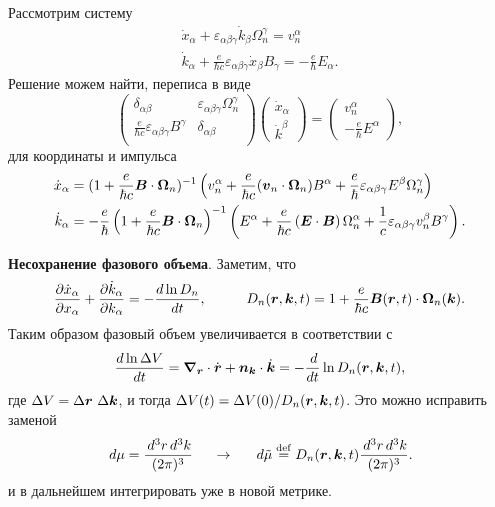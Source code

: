 Рассмотрим систему
\begin{align*}
	\dot{x}_\alpha + \varepsilon_{\alpha \beta \gamma} \dot{k}_\beta \Omega_n^\gamma = v_n^\alpha \\ 
	\dot{k}_\alpha + \frac{e}{\hbar c} \varepsilon_{\alpha \beta \gamma} \dot{x}_\beta B_\gamma = - \frac{e}{\hbar} E_\alpha.
\end{align*}
Решение можем найти, переписа в виде
\begin{equation*}
	\begin{pmatrix}
	    \delta_{\alpha \beta} & \varepsilon_{\alpha \beta \gamma} \Omega^\gamma_n  \\
	    \frac{e}{\hbar c}\varepsilon_{\alpha \beta \gamma} B^\gamma & \delta_{\alpha \beta}  \\
	\end{pmatrix} \begin{pmatrix}
		\dot{x}_\alpha \\ \dot{k}^\beta
	\end{pmatrix} = \begin{pmatrix}
		v_n^{\alpha} \\  -\frac{e}{\hbar} E^{\alpha}
	\end{pmatrix},
\end{equation*}
для координаты и импульса
\begin{align*}
	\dot{x}_\alpha &= (1 + \frac{e}{\hbar c} \boldsymbol{B} \cdot \boldsymbol{\Omega}_n)^{-1}\left(
		v_n^\alpha + \frac{e}{\hbar c} (\boldsymbol{v}_n \cdot \boldsymbol{\Omega}_n) B^\alpha + \frac{e}{\hbar} \varepsilon_{\alpha \beta \gamma} E^\beta \Omega_n^\gamma
	\right) \\
	\dot{k}_\alpha &= -\frac{e}{\hbar} \left(1 + \frac{e}{\hbar c} \boldsymbol{B} \cdot \boldsymbol{\Omega}_n\right)^{-1} \left(
		E^\alpha + \frac{e}{\hbar c} \left(\boldsymbol{E} \cdot \boldsymbol{B}\right) \Omega_n^\alpha + \frac{1}{c} \varepsilon_{\alpha \beta \gamma} v_n^\beta B^\gamma
	\right).
\end{align*}

\textbf{Несохранение фазового объема}. Заметим, что
\begin{equation*}
	\frac{\partial \dot{x}_\alpha}{\partial x_\alpha}  + \frac{\partial \dot{k}_\alpha}{\partial k_\alpha} = - \frac{d \ln D_n}{d t},
	\hspace{10 mm} 
	D_n(\vc{r}, \vc{k}, t) = 1 + \frac{e}{\hbar c} \vc{B}(\vc{r}, t) \cdot \vc{\Omega}_n (\vc{k}).
\end{equation*}
Таким образом фазовый объем увеличивается в соответствии с 
\begin{equation*}
	\frac{d \ln \Delta V}{d t}  = \boldsymbol{\nabla}_{\boldsymbol{r}} \cdot \dot{\boldsymbol{r}} + \boldsymbol{n}_{\boldsymbol{k}} \cdot \dot{\boldsymbol{k}} = - \frac{\, d}{dt} \ln D_n (\boldsymbol{r}, \boldsymbol{k}, t),
\end{equation*}
где $\Delta V = \Delta \boldsymbol{r} \ \Delta \boldsymbol{k}$, и тогда $\Delta V(t) = \Delta V(0) / D_n (\boldsymbol{r}, \boldsymbol{k}, t)$.
Это можно исправить заменой
\begin{equation*}
	\, d \mu = \frac{\, d^3 r \, d^3 k}{(2\pi)^3} 
	\hspace{5 mm} 
	\to
	\hspace{5 mm} 
	\, d \tilde{\mu} \overset{\mathrm{def}}{=} D_n(\boldsymbol{r}, \boldsymbol{k}, t) \frac{\, d^3 r \, d^3 k}{(2\pi)^3} .
\end{equation*}
и в дальнейшем интегрировать уже в новой метрике.


